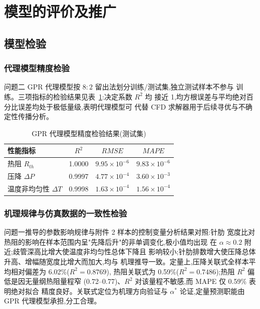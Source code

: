 %
\section{模型的评价及推广}

\subsection{模型检验}

\subsubsection{代理模型精度检验}

问题二 GPR 代理模型按 $8:2$ 留出法划分训练/测试集,独立测试样本不参与
训练。三项指标的检验结果见表~\ref{tab:model-check}:决定系数 $R^2$ 均
接近 1,均方根误差与平均绝对百分比误差均处于极低量级,表明代理模型可
代替 CFD 求解器用于后续寻优与不确定性传播分析。

\begin{table}[h]
\centering
\caption{GPR 代理模型精度检验结果(测试集)}
\label{tab:model-check}
\begin{tabular}{lccc}
\toprule
性能指标 & $R^2$ & $RMSE$ & $MAPE$ \\
\midrule
热阻 $R_{th}$      & 1.0000 & $9.95\times10^{-6}$ & $9.83\times10^{-6}$ \\
压降 $\Delta P$    & 0.9997 & $4.77\times10^{-4}$ & $3.60\times10^{-3}$ \\
温度非均匀性 $\Delta T$ & 0.9998 & $1.63\times10^{-4}$ & $1.56\times10^{-4}$ \\
\bottomrule
\end{tabular}
\end{table}

\subsubsection{机理规律与仿真数据的一致性检验}

问题一推导的参数影响规律与附件 2 样本的控制变量分析结果对照:针肋
宽度比对热阻的影响在样本范围内呈"先降后升"的非单调变化,极小值均出现
在 $\alpha \approx 0.2$ 附近;歧管深高比增大使温度非均匀性总体下降且
影响较小;针肋排数增大使压降总体升高、增幅随宽度比增大而加大,均与
机理推导一致。定量上,压降关联式全样本平均相对偏差为 6.02\%($R^2=0.8769$),
热阻关联式为 0.59\%($R^2=0.7486$);热阻 $R^2$ 偏低是因无量纲热阻量程窄
(0.72--0.77)、$R^2$ 对该量程不敏感,而 MAPE 仅 0.59\% 表明绝对拟合
精度良好。关联式定位为机理方向验证与 $\alpha^*$ 论证,定量预测职能由
GPR 代理模型承担,分工合理。

